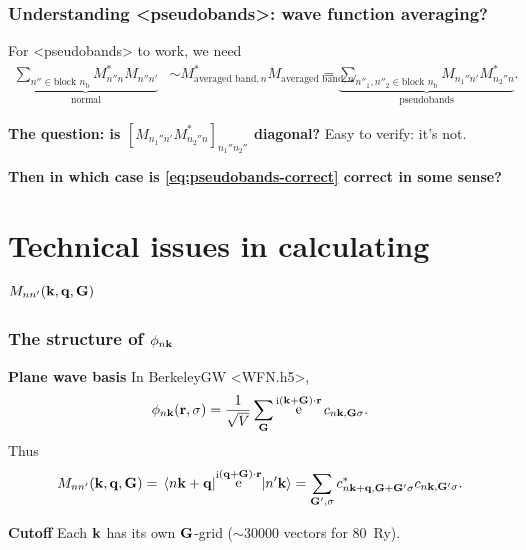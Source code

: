 \documentclass[t,aspectratio=169]{beamer}
\DeclareMathOperator{\ee}{e}
\DeclareMathOperator{\ii}{i}
\newcommand{\shortcode}[1]{\texttt{#1}}
\def\\{}%
\def\texttt#1{<#1>}%
\begin{document}
\begin{frame}
\frametitle{Understanding \shortcode{pseudobands}: wave function averaging?}

For \shortcode{pseudobands} to work, we need 
\begin{equation}
    \begin{aligned}
        \underbrace{
            \sum_{n'' \in \text{block $n_{\text{b}}$}} M_{n'' n}^* M_{n'' n'} 
        }_{\text{normal}}
        &\sim M_{\text{averaged band}, n}^* M_{\text{averaged band}, n'} \\
        &= \underbrace{
            \sum_{n''_1, n''_2 \in \text{block $n_{\text{b}}$}} M_{n_1'' n'} M_{n_2'' n}^*
        }_{\text{pseudobands}}.
    \end{aligned}
    \label{eq:pseudobands-correct}
\end{equation}

\textbf{The question: is $[M_{n_1'' n'} M_{n_2'' n}^*]_{n_1'' n_2''}$ diagonal?}
Easy to verify: it's not.

\vspace{0.5cm}

\textbf{Then in which case is \eqref{eq:pseudobands-correct} correct in some sense?} 

\end{frame}

\section{Technical issues in calculating $M_{nn'}(\vb{k}, \vb{q}, \vb{G})$}

\begin{frame}
\frametitle{The structure of $\phi_{n \vb{k}}$}

\textbf{Plane wave basis} In BerkeleyGW \shortcode{WFN.h5}, 
\begin{equation*}
    \phi_{n \vb{k}}(\vb{r}, \sigma) = \frac{1}{\sqrt{V}} \sum_{\vb{G}} \ee^{\ii (\vb{k} + \vb{G}) \cdot \vb{r}} c_{n \vb{k}, \vb{G} \sigma}.
\end{equation*}    
Thus 
\begin{equation*}
    M_{nn'}(\vb{k}, \vb{q}, \vb{G}) 
    = \mel*{n \vb{k} + \vb{q}}{\ee^{\ii (\vb{q} + \vb{G}) \cdot \vb{r}}}{n' \vb{k}} 
    = \sum_{\vb{G}', \sigma} c^*_{n \vb{k} + \vb{q}, \vb{G} + \vb{G}' \sigma} c_{n \vb{k}, \vb{G}' \sigma}.
\end{equation*}

\textbf{Cutoff} Each $\vb{k}$ has its own $\vb{G}$-grid ($\sim 30000$ vectors for \SI{80}{Ry}).

\end{frame}
\end{document}

